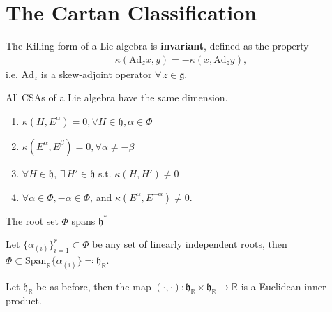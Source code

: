 \documentclass[11pt,final]{article}
\begin{document}
\section{The Cartan Classification}

\begin{prop}
The Killing form of a Lie algebra is \textbf{invariant}, defined as the property
\begin{align}
\kappa ( \text{Ad}_z x,y) = - \kappa( x, \text{Ad}_z y),
\end{align}
i.e. $\text{Ad}_z$ is a skew-adjoint operator $\forall \, z \in \mathfrak{g}$.
\end{prop}

\begin{prop}
All CSAs of a Lie algebra have the same dimension.
\end{prop}

\begin{prop}
\begin{enumerate}[label=(\roman*)]
\item \label{CWBFact1} $\kappa(H,E^\alpha) = 0, \forall H \in \mathfrak{h}, \alpha \in \Phi$
\item \label{CWBFact2} $\kappa(E^\alpha, E^\beta) = 0, \forall \alpha \neq -\beta$
\item \label{CWBFact3} $\forall H \in \mathfrak{h}, \, \exists \, H' \in \mathfrak{h}$ s.t. $\kappa(H,H') \neq 0$
\item \label{CWBFact4} $\forall \alpha \in \Phi, -\alpha \in \Phi$, and $\kappa(E^\alpha, E^{-\alpha}) \neq 0$.
\end{enumerate}
\end{prop}

\begin{prop}
The root set $\Phi$ spans $\mathfrak{h}^*$
\end{prop}

\begin{prop}
Let $\{ \alpha_{(i)} \}_{i=1}^r \subset \Phi$ be any set of linearly independent roots, then $\Phi \subset \text{Span}_\mathbb{R} \{ \alpha_{(i)} \} \eqqcolon \mathfrak{h}_\mathbb{R}$.
\end{prop}

\begin{prop}\label{prop:realRootGeometry}
Let $\mathfrak{h}_\mathbb{R}$ be as before, then the map $(\cdot,\cdot): \mathfrak{h}_\mathbb{R} \times \mathfrak{h}_\mathbb{R} \to \mathbb{R}$ is a Euclidean inner product.
\end{prop}
\end{document}
